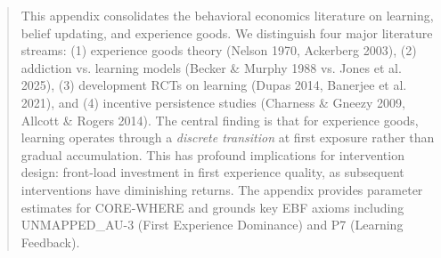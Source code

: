 \documentclass[11pt, a4paper]{article}
\begin{document}

\begin{abstract}
This appendix consolidates the behavioral economics literature on learning, belief updating, and experience goods. We distinguish four major literature streams: (1) experience goods theory (Nelson 1970, Ackerberg 2003), (2) addiction vs. learning models (Becker \& Murphy 1988 vs. Jones et al. 2025), (3) development RCTs on learning (Dupas 2014, Banerjee et al. 2021), and (4) incentive persistence studies (Charness \& Gneezy 2009, Allcott \& Rogers 2014). The central finding is that for experience goods, learning operates through a \textit{discrete transition} at first exposure rather than gradual accumulation. This has profound implications for intervention design: front-load investment in first experience quality, as subsequent interventions have diminishing returns. The appendix provides parameter estimates for CORE-WHERE and grounds key EBF axioms including UNMAPPED_AU-3 (First Experience Dominance) and P7 (Learning Feedback).
\end{abstract}


\end{document}
